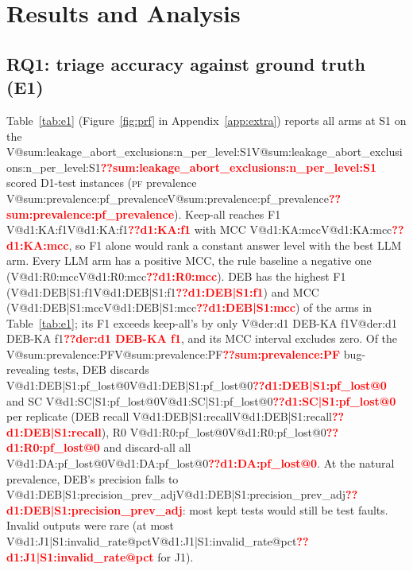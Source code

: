 \documentclass[pdflatex,iicol,sn-mathphys-num]{sn-jnl}
\makeatletter
\newcommand{\V}[1]{\ifcsname V@#1\endcsname\csname V@#1\endcsname\else\textbf{\textcolor{red}{??#1}}\fi}
\newcommand{\PF}{\textsc{pf}}
\makeatother
\begin{document}
\section{Results and Analysis}\label{sec:results}

\subsection{RQ1: triage accuracy against ground truth (E1)}
Table~\ref{tab:e1} (Figure~\ref{fig:prf} in Appendix~\ref{app:extra}) reports all arms at S1 on the \V{sum:leakage_abort_exclusions:n_per_level:S1} scored D1-test instances (\PF{} prevalence \V{sum:prevalence:pf_prevalence}). Keep-all reaches F1 \V{d1:KA:f1} with MCC \V{d1:KA:mcc}, so F1 alone would rank a constant answer level with the best LLM arm. Every LLM arm has a positive MCC, the rule baseline a negative one (\V{d1:R0:mcc}). DEB has the highest F1 (\V{d1:DEB|S1:f1}) and MCC (\V{d1:DEB|S1:mcc}) of the arms in Table~\ref{tab:e1}; its F1 exceeds keep-all's by only \V{der:d1 DEB-KA f1}, and its MCC interval excludes zero. Of the \V{sum:prevalence:PF} bug-revealing tests, DEB discards \V{d1:DEB|S1:pf_lost@0} and SC \V{d1:SC|S1:pf_lost@0} per replicate (DEB recall \V{d1:DEB|S1:recall}), R0 \V{d1:R0:pf_lost@0} and discard-all all \V{d1:DA:pf_lost@0}. At the natural prevalence, DEB's precision falls to \V{d1:DEB|S1:precision_prev_adj}: most kept tests would still be test faults. Invalid outputs were rare (at most \V{d1:J1|S1:invalid_rate@pct} for J1).
\end{document}
